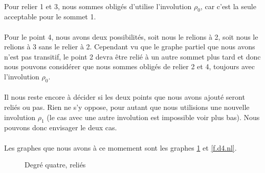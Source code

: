 \documentclass[a4paper]{article}
\theoremstyle{mytheorem}
\begin{document}
\paragraph{}
Pour relier 1 et 3, nous sommes obligés d'utilise l'involution $\rho_0$, car c'est la seule acceptable pour le sommet 1.

\paragraph{}
Pour le point 4, nous avons deux possibilités, soit nous le relions à 2, soit nous le relions à 3 sans le relier à 2. Cependant vu que le graphe partiel que nous avons n'est pas transitif, le point 2 devra être relié à un autre sommet plus tard et donc nous pouvons considérer que nous sommes obligés de relier 2 et 4, toujours avec l'involution $\rho_0$.

\paragraph{}
Il nous reste encore à décider si les deux points que nous avons ajouté seront reliés ou pas. Rien ne s'y oppose, pour autant que nous utilisions une nouvelle involution $\rho_1$ (le cas avec une autre involution est impossible voir plus bas). Nous pouvons donc envisager le deux cas.

\paragraph{}
Les graphes que nous avons à ce momement sont les graphes \ref{f.d4.l} et \ref{f.d4.nl}.

\begin{figure}[H]
  \begin{center}
  \end{center}
  \caption{Degré quatre, reliés}
  \label{f.d4.l}
\end{figure}
\end{document}
